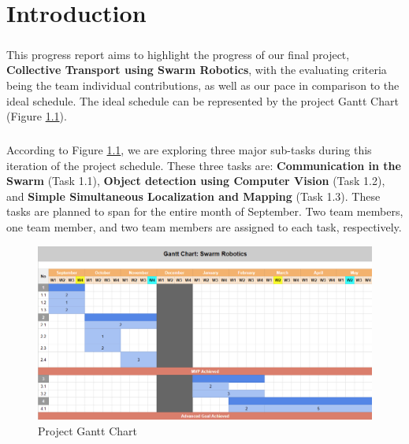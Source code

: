 \chapter{Introduction}

\paragraph*{}
This progress report aims to highlight the progress of our final project, \textbf{Collective Transport using Swarm Robotics}, with the evaluating criteria being the team individual contributions, as well as our pace in comparison to the ideal schedule. The ideal schedule can be represented by the project Gantt Chart (Figure \ref{fig:gantt_chart}).

\paragraph*{}
According to Figure \ref{fig:gantt_chart}, we are exploring three major sub-tasks during this iteration of the project schedule. These three tasks are: \textbf{Communication in the Swarm} (Task 1.1), \textbf{Object detection using Computer Vision} (Task 1.2), and \textbf{Simple Simultaneous Localization and Mapping} (Task 1.3). These tasks are planned to span for the entire month of September. Two team members, one team member, and two team members are assigned to each task, respectively.

\begin{figure}[H]
    \centering
    \includegraphics[width=1\linewidth]{progress_report_1/assets/images/introduction/gantt_chart.png}
    \caption{Project Gantt Chart}
    \label{fig:gantt_chart}
\end{figure}

